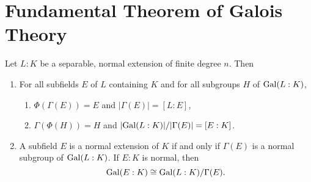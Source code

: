 \section{Fundamental Theorem of Galois Theory}
\begin{theorem}
  Let $L : K$ be a separable, normal extension of
  finite degree $n$. Then
  \begin{enumerate}
    \item For all subfields $E$ of $L$ containing
      $K$ and for all subgroups $H$ of $\operatorname{Gal}(L : K)$,
      \begin{enumerate}
        \item $\Phi(\Gamma(E)) = E$ and
          $|\Gamma(E)| = [L : E]$,
        \item $\Gamma(\Phi(H)) = H$ and
          $|{\operatorname{Gal}(L : K)}| / |\Gamma(E)| = [E : K]$.
      \end{enumerate}
    \item A subfield $E$ is a normal extension of $K$
      if and only if $\Gamma(E)$ is a normal subgroup
      of $\operatorname{Gal}(L : K)$. If $E : K$ is normal, then
      \[
        \operatorname{Gal}(E : K) \cong \operatorname{Gal}(L : K) / \Gamma(E).
      \]
  \end{enumerate}
\end{theorem}

